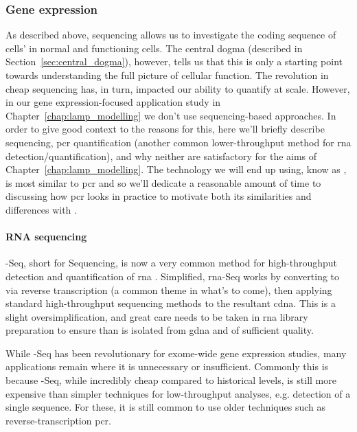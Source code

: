 \documentclass[thesis.tex]{subfiles}
\begin{document}
\subsubsection{Gene expression}
As described above,  sequencing allows us to investigate the coding sequence of cells'  in normal and functioning cells. The central dogma (described in Section~\ref{sec:central_dogma}), however, tells us that this is only a starting point towards understanding the full picture of cellular function. The revolution in cheap  sequencing has, in turn, impacted our ability to quantify  at scale. However, in our gene expression-focused application study in Chapter~\ref{chap:lamp_modelling} we don't use sequencing-based approaches. In order to give good context to the reasons for this, here we'll briefly describe  sequencing, \gls{pcr} quantification (another common lower-throughput method for \gls{rna} detection/quantification), and why neither are satisfactory for the aims of Chapter~\ref{chap:lamp_modelling}. The technology we will end up using, know as , is most similar to \gls{pcr} and so we'll dedicate a reasonable amount of time to discussing how \gls{pcr} looks in practice to motivate both its similarities and differences with .

\paragraph{RNA sequencing}
-Seq, short for  Sequencing, is now a very common method for high-throughput detection and quantification of \gls{rna} \citep{wang_rna-seq_2009}. Simplified, \gls{rna}-Seq works by converting  to  via reverse transcription (a common theme in what's to come), then applying standard high-throughput sequencing methods to the resultant \gls{cdna}. This is a slight oversimplification, and great care needs to be taken in \gls{rna} library preparation to ensure than  is isolated from \gls{gdna} and of sufficient quality.

While -Seq has been revolutionary for exome-wide gene expression studies, many applications remain where it is unnecessary or insufficient. Commonly this is because -Seq, while incredibly cheap compared to historical levels, is still more expensive than simpler techniques for low-throughput analyses, e.g. detection of a single  sequence. For these, it is still common to use older techniques such as reverse-transcription \gls{pcr}. 
\end{document}
